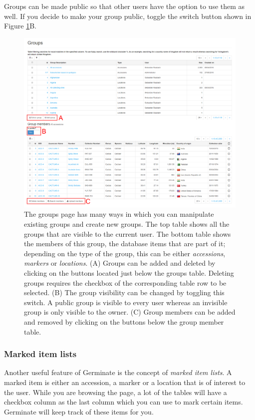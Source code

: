 Groups can be made public so that other users have the option to use them as well. If you decide to make your group public, toggle the switch button shown in Figure \ref{fig:features:groups-page}B.

\begin{figure}
	\centering
	\includegraphics[width=0.85\linewidth]{img/features/groups-page.png}
	\caption{The groups page has many ways in which you can manipulate existing groups and create new groups. The top table shows all the groups that are visible to the current user. The bottom table shows the members of this group, \ie the database items that are part of it; depending on the type of the group, this can be either \textit{accessions}, \textit{markers} or \textit{locations}. (A) Groups can be added and deleted by clicking on the buttons located just below the groups table. Deleting groups requires the checkbox of the corresponding table row to be selected. (B) The group visibility can be changed by toggling this switch. A public group is visible to every user whereas an invisible group is only visible to the owner. (C) Group members can be added and removed by clicking on the buttons below the group member table.}
	\label{fig:features:groups-page}
\end{figure}

\subsubsection{Marked item lists}
\label{sec:features:marked-items}

Another useful feature of Germinate is the concept of \textit{marked item lists}. A marked item is either an accession, a marker or a location that is of interest to the user. While you are browsing the page, a lot of the tables will have a checkbox column as the last column which you can use to mark certain items. Germinate will keep track of these items for you.


